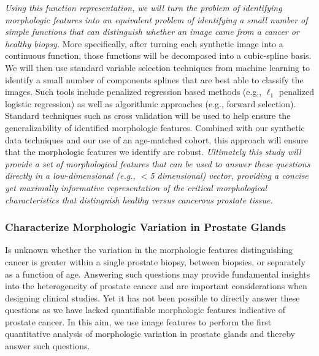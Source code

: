 \documentclass{NIHGrant}
\theoremstyle{theorem}
\begin{document}
\textit{Using this function representation, we will turn the problem of identifying morphologic features into an equivalent problem of identifying a small number of simple functions that can distinguish whether an image came from a cancer or healthy biopsy.} More specifically, after turning each synthetic image into a continuous function, those functions will be decomposed into a cubic-spline basis. We will then use standard variable selection techniques from machine learning to identify a small number of components splines that are best able to classify the images. Such tools include penalized regression based methods (e.g., \(\ell_{1}\) penalized logistic regression) as well as algorithmic approaches (e.g., forward selection). Standard techniques such as cross validation will be used to help ensure the generalizability of identified morphologic features. Combined with our synthetic data techniques and our use of an age-matched cohort, this approach will ensure that the morphologic features we identify are robust. \emph{Ultimately this study will provide a set of morphological features that can be used to answer these questions directly in a low-dimensional (e.g., $<$5 dimensional) vector, providing a concise yet maximally informative representation of the critical morphological characteristics that distinguish healthy versus cancerous prostate tissue.}

\subsubsection*{Characterize Morphologic Variation in Prostate Glands} \label{aim3.2}
Is unknown whether the variation in the morphologic features distinguishing cancer is greater within a single prostate biopsy, between biopsies, or separately as a function of age. Answering such questions may provide fundamental insights into the heterogeneity of prostate cancer and are important considerations when designing clinical studies. Yet it has not been possible to directly answer these questions as we have lacked quantifiable morphologic features indicative of prostate cancer. In this aim, we use image features to perform the first quantitative analysis of morphologic variation in prostate glands and thereby answer such questions.
\end{document}
